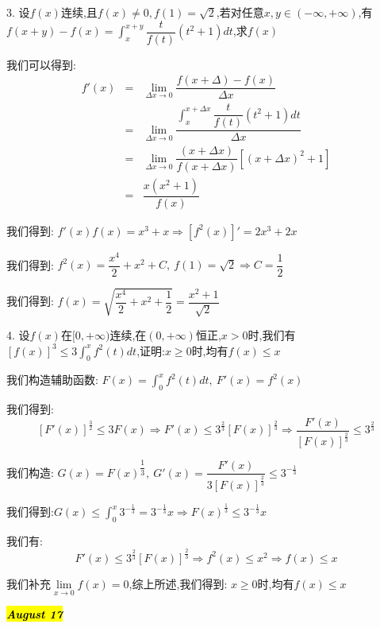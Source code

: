 3. 设$f(x)$连续,且$f(x)\neq 0,f(1)=\sqrt{2}$,若对任意$x,y\in(-\infty,+\infty)$,有$f(x+y)-f(x)=\int_{x}^{x+y}\dfrac{t}{f(t)}(t^2+1)dt$,求$f(x)$
\begin{solution}

	我们可以得到:
	\begin{eqnarray*}
		f'(x)&=&\lim\limits_{\Delta x\rightarrow 0}\dfrac{f(x+\Delta)-f(x)}{\Delta x}\\
		&=&\lim\limits_{\Delta x\rightarrow 0}\dfrac{\int_{x}^{x+\Delta x}\dfrac{t}{f(t)}(t^2+1)dt}{\Delta x}\\
		&=&\lim\limits_{\Delta x\rightarrow 0}\dfrac{(x+\Delta x)}{f(x+\Delta x)}\left[ (x+\Delta x)^2+1\right] \\
		&=&\dfrac{x(x^2+1)}{f(x)}
	\end{eqnarray*}

	我们得到:  $f'(x)f(x)=x^3+x\Rightarrow [f^2(x)]'=2x^3+2x$
	
	我们得到:  $f^{2}(x)=\dfrac{x^4}{2}+x^2+C,\ f(1)=\sqrt{2}\Rightarrow C=\dfrac{1}{2}$
	
	我们得到:  $f(x)=\sqrt{\dfrac{x^4}{2}+x^2+\dfrac{1}{2}}=\dfrac{x^2+1}{\sqrt{2}}$
\end{solution}

4. 设$f(x)$在$[0,+\infty)$连续,在$(0,+\infty)$恒正,$x>0$时,我们有$\left[ f(x)\right]^3\leq 3\int_{0}^{x}f^{2}(t)dt$,证明:$x\geq 0\text{时,均有}f(x)\leq x$
\begin{solution}

	我们构造辅助函数:  $F(x)=\int_{0}^{x}f^{2}(t)dt,\ F'(x)=f^{2}(x)$
	
	我们得到:  $$[F'(x)]^{\frac{3}{2}}\leq 3F(x)\Rightarrow F'(x)\leq 3^{\frac{2}{3}}[F(x)]^{\frac{2}{3}}\Rightarrow \dfrac{F'(x)}{[F(x)]^{\frac{2}{3}}}\leq 3^{\frac{2}{3}}$$
	
	我们构造:  $G(x)=F(x)^{\dfrac{1}{3}},\ G'(x)=\dfrac{F'(x)}{3[F(x)]^{\frac{2}{3}}}\leq 3^{-\frac{1}{3}}$
	
	我们得到:$G(x)\leq \int_{0}^{x}3^{-\frac{1}{3}}=3^{-\frac{1}{3}}x\Rightarrow F(x)^{\frac{1}{3}}\leq3^{-\frac{1}{3}}x$
	
	我们有:$$F'(x)\leq 3^{\frac{2}{3}}[F(x)]^{\frac{2}{3}}\Rightarrow f^{2}(x)\leq x^2\Rightarrow f(x)\leq x$$

	我们补充$\lim\limits_{x\rightarrow 0}f(x)=0$,综上所述,我们得到:  $x\geq 0\text{时,均有}f(x)\leq x$	
	
\end{solution}

\hl{\textbf{\textit{August 17}}}

